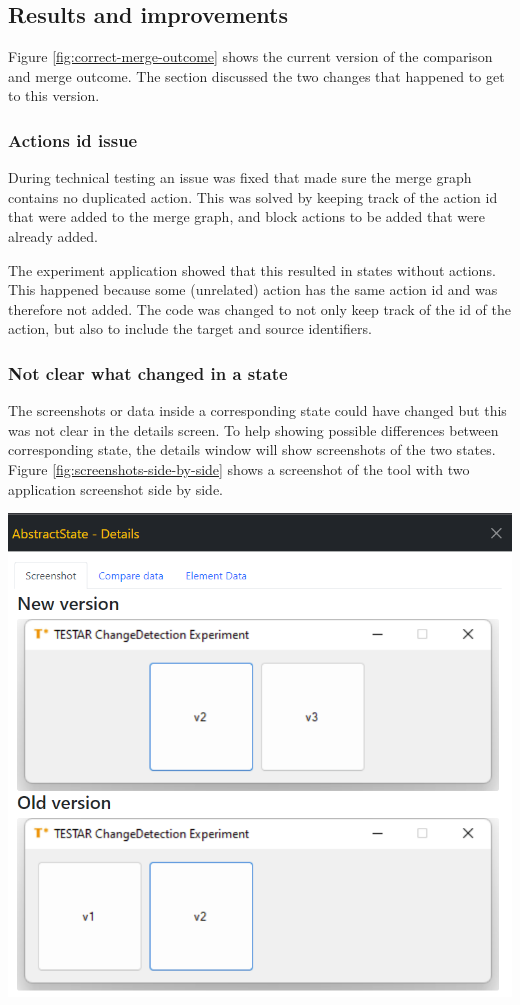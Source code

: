 \subsection{Results and improvements}
Figure \ref{fig:correct-merge-outcome} shows the current version of the comparison and merge outcome. The section discussed the two changes that happened to get to this version.

\subsubsection{Actions id issue}
During technical testing an issue was fixed that made sure the merge graph contains no duplicated action. This was solved by keeping track of the action id that were added to the merge graph, and block actions to be added that were already added.

The experiment application showed that this resulted in states without actions. This happened because some (unrelated) action has the same action id and was therefore not added. The code was changed to not only keep track of the id of the action, but also to include the target and source identifiers.  

\subsubsection{Not clear what changed in a state}
The screenshots or data inside a corresponding state could have changed but this was not clear in the details screen. To help showing possible differences between corresponding state, the details window will show screenshots of the two states. Figure \ref{fig:screenshots-side-by-side} shows a screenshot of the tool with two application screenshot side by side. 

\begingroup
\captionsetup{type=figure}
\includegraphics[scale=0.6]{images/6-Screenshot-Side-By-Side.png}
\label{fig:screenshots-side-by-side}
\endgroup
